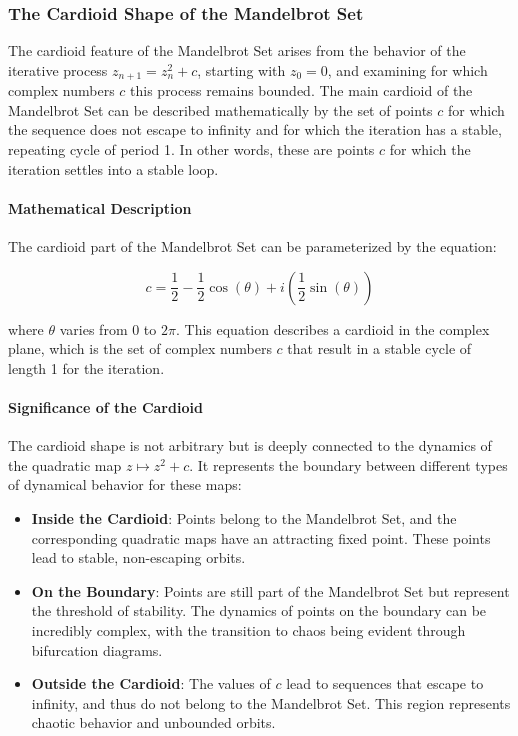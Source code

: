 \documentclass[
]{article}
\providecommand{\tightlist}{%
  \setlength{\itemsep}{0pt}\setlength{\parskip}{0pt}}
\def\tightlist{}
\begin{document}
\subsubsection{The Cardioid Shape of the Mandelbrot
Set}\label{the-cardioid-shape-of-the-mandelbrot-set}

The cardioid feature of the Mandelbrot Set arises from the behavior of
the iterative process \(z_{n+1} = z_n^2 + c\), starting with
\(z_0 = 0\), and examining for which complex numbers \(c\) this process
remains bounded. The main cardioid of the Mandelbrot Set can be
described mathematically by the set of points \(c\) for which the
sequence does not escape to infinity and for which the iteration has a
stable, repeating cycle of period 1. In other words, these are points
\(c\) for which the iteration settles into a stable loop.

\paragraph{Mathematical Description}\label{mathematical-description}

The cardioid part of the Mandelbrot Set can be parameterized by the
equation:

\[ c = \frac{1}{2} - \frac{1}{2}\cos(\theta) + i\left(\frac{1}{2}\sin(\theta)\right) \]

where \(\theta\) varies from 0 to \(2\pi\). This equation describes a
cardioid in the complex plane, which is the set of complex numbers \(c\)
that result in a stable cycle of length 1 for the iteration.

\paragraph{Significance of the
Cardioid}\label{significance-of-the-cardioid}

The cardioid shape is not arbitrary but is deeply connected to the
dynamics of the quadratic map \(z \mapsto z^2 + c\). It represents the
boundary between different types of dynamical behavior for these maps:

\begin{itemize}
\tightlist
\item
  \textbf{Inside the Cardioid}: Points belong to the Mandelbrot Set, and
  the corresponding quadratic maps have an attracting fixed point. These
  points lead to stable, non-escaping orbits.
\item
  \textbf{On the Boundary}: Points are still part of the Mandelbrot Set
  but represent the threshold of stability. The dynamics of points on
  the boundary can be incredibly complex, with the transition to chaos
  being evident through bifurcation diagrams.
\item
  \textbf{Outside the Cardioid}: The values of \(c\) lead to sequences
  that escape to infinity, and thus do not belong to the Mandelbrot Set.
  This region represents chaotic behavior and unbounded orbits.
\end{itemize}
\end{document}
